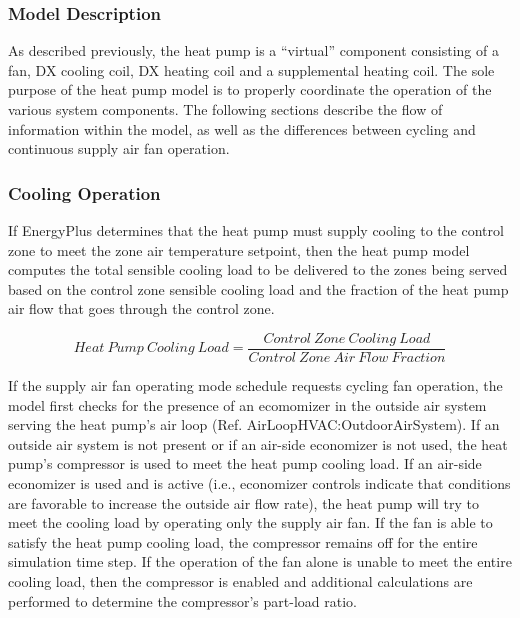 \subsubsection{Model Description}\label{model-description-3}

As described previously, the heat pump is a ``virtual'' component consisting of a fan, DX cooling coil, DX heating coil and a supplemental heating coil. The sole purpose of the heat pump model is to properly coordinate the operation of the various system components. The following sections describe the flow of information within the model, as well as the differences between cycling and continuous supply air fan operation.

\subsubsection{Cooling Operation}\label{cooling-operation-1}

If EnergyPlus determines that the heat pump must supply cooling to the control zone to meet the zone air temperature setpoint, then the heat pump model computes the total sensible cooling load to be delivered to the zones being served based on the control zone sensible cooling load and the fraction of the heat pump air flow that goes through the control zone.

\begin{equation}
Heat~Pump~Cooling~Load = \frac{{Control~Zone~Cooling~Load}}{{Control~Zone~Air~Flow~Fraction}}
\end{equation}

If the supply air fan operating mode schedule requests cycling fan operation, the model first checks for the presence of an ecomomizer in the outside air system serving the heat pump's air loop (Ref. AirLoopHVAC:OutdoorAirSystem). If an outside air system is not present or if an air-side economizer is not used, the heat pump's compressor is used to meet the heat pump cooling load. If an air-side economizer is used and is active (i.e., economizer controls indicate that conditions are favorable to increase the outside air flow rate), the heat pump will try to meet the cooling load by operating only the supply air fan. If the fan is able to satisfy the heat pump cooling load, the compressor remains off for the entire simulation time step. If the operation of the fan alone is unable to meet the entire cooling load, then the compressor is enabled and additional calculations are performed to determine the compressor's part-load ratio.

